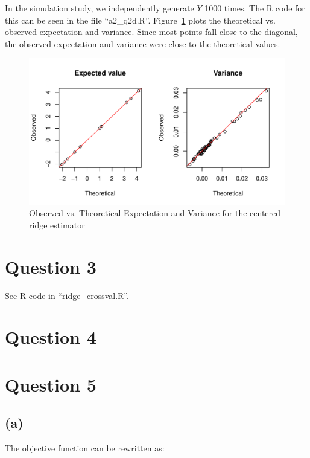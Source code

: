 \documentclass{article}\usepackage[]{graphicx}\usepackage[]{color}
\makeatletter
\def\maxwidth{ %
  \ifdim\Gin@nat@width>\linewidth
    \linewidth
  \else
    \Gin@nat@width
  \fi
}
\newenvironment{knitrout}{}{} %
\makeatother
\begin{document}
\vspace{0.5in}

In the simulation study, we independently generate $Y$ 1000 times.  The R code for this can be seen in the file ``a2\_q2d.R''. Figure~\ref{fig:q2_graphs} plots the theoretical vs. observed expectation and variance.  Since most points fall close to the diagonal, the observed expectation and variance were close to the theoretical values.


\begin{knitrout}
\color{fgcolor}\begin{figure}
\includegraphics[width=\maxwidth]{figure/q2_graphs-1} \caption[Observed vs]{Observed vs. Theoretical Expectation and Variance for the centered ridge estimator}\label{fig:q2_graphs}
\end{figure}


\end{knitrout}


\section*{Question 3}
See R code in ``ridge\_crossval.R''.

\section*{Question 4}

\section*{Question 5}
\subsection*{(a)}
The objective function can be rewritten as:
\end{document}
